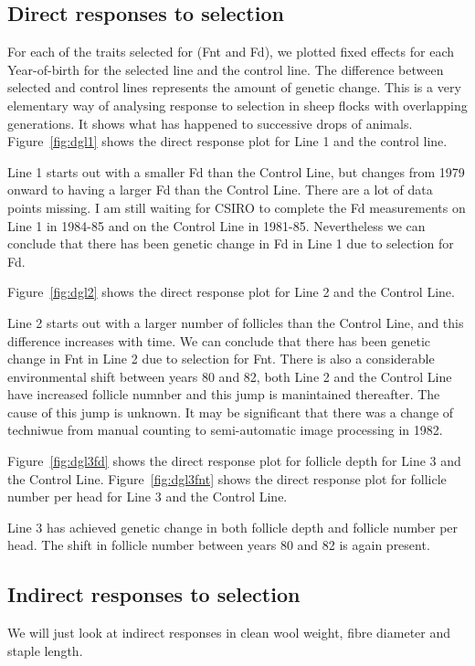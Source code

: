 \documentclass[titlepage]{article}  %
\begin{document}
\subsection{Direct responses to selection}
For each of the traits selected for (Fnt and Fd),   we plotted fixed effects for each Year-of-birth for the selected line and the control line. The difference between selected and control lines represents the amount of genetic change.  This is a very elementary way of analysing response to selection in sheep flocks with overlapping generations. It shows what has happened to successive drops of animals. Figure~\ref{fig:dgl1} shows the direct response plot for Line 1 and the control line.



 Line 1 starts out with a smaller Fd than the Control Line, but changes from 1979 onward to having a larger Fd than the Control Line. There are a lot of data points missing. I am still waiting for CSIRO to complete the Fd measurements on Line 1 in 1984-85 and on the Control Line in 1981-85. Nevertheless we can conclude that there has been genetic change in Fd in Line 1 due to selection for Fd.

Figure~\ref{fig:dgl2} shows the direct response plot for Line 2 and the Control Line.


Line 2 starts out with a larger number of follicles than the Control Line, and this difference increases with time. We can conclude that there has been genetic change in Fnt in Line 2 due to selection for Fnt. There is also a considerable environmental shift between years 80 and 82, both Line 2 and the Control Line have increased follicle numnber and this jump is manintained thereafter. The cause of this jump is unknown. It may be significant that there was a change of techniwue from manual counting to semi-automatic image processing in 1982.

Figure~\ref{fig:dgl3fd} shows the direct response plot for follicle depth for Line 3 and the Control Line. Figure~\ref{fig:dgl3fnt} shows the direct response plot for follicle number per head for Line 3 and the Control Line.




Line 3 has achieved genetic change in both follicle depth and follicle number per head. The shift in follicle number between years 80 and 82 is again present. 

\subsection{Indirect responses to selection}
We will just look at indirect responses in clean wool weight, fibre diameter and staple length.
\end{document}
